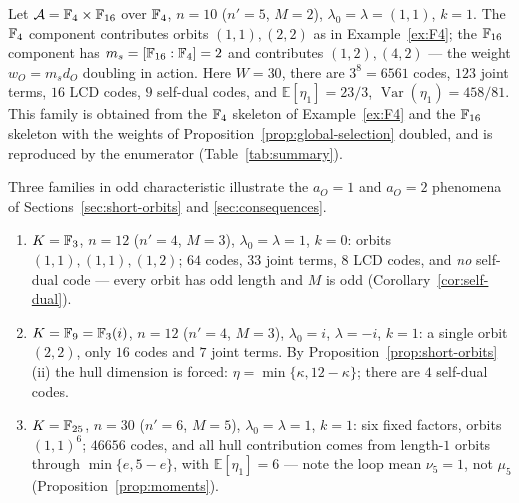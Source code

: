 \begin{example}\label{ex:mixed}
Let $\mathcal A=\mathbb F_4\times\mathbb F_{16}$ over $\mathbb F_4$, $n=10$ ($n'=5$, $M=2$),
$\lambda_0=\lambda=(1,1)$, $k=1$.  The $\mathbb F_4$ component contributes orbits
$(1,1),(2,2)$ as in Example~\ref{ex:F4}; the $\mathbb F_{16}$ component has
$m_s=[\mathbb F_{16}:\mathbb F_4]=2$ and contributes $(1,2),(4,2)$ --- the weight
$w_O=m_sd_O$ doubling in action.  Here $W=30$, there are $3^8=6561$ codes,
$123$ joint terms, $16$ LCD codes, $9$ self-dual codes, and
$\mathbb{E}[\eta_1]=23/3$, $\operatorname{Var}(\eta_1)=458/81$.  This family
is obtained from the $\mathbb F_4$ skeleton of Example~\ref{ex:F4} and the
$\mathbb F_{16}$ skeleton with the weights of Proposition~\ref{prop:global-selection}
doubled, and is reproduced by the enumerator (Table~\ref{tab:summary}).
\end{example}

\begin{example}\label{ex:char35}
Three families in odd characteristic illustrate the $a_O=1$ and $a_O=2$
phenomena of Sections~\ref{sec:short-orbits} and
\ref{sec:consequences}.
\begin{enumerate}
\item[\textup{(a)}] $K=\mathbb F_3$, $n=12$ ($n'=4$, $M=3$), $\lambda_0=\lambda=1$,
$k=0$: orbits $(1,1),(1,1),(1,2)$; $64$ codes, $33$ joint terms, $8$ LCD
codes, and \emph{no} self-dual code --- every orbit has odd length and $M$
is odd (Corollary~\ref{cor:self-dual}).
\item[\textup{(b)}] $K=\mathbb F_9=\mathbb F_3(i)$, $n=12$ ($n'=4$, $M=3$),
$\lambda_0=i$, $\lambda=-i$, $k=1$: a single orbit $(2,2)$, only $16$ codes
and $7$ joint terms.  By Proposition~\ref{prop:short-orbits}(ii) the hull
dimension is forced: $\eta=\min\{\kappa,12-\kappa\}$; there are $4$ self-dual
codes.
\item[\textup{(c)}] $K=\mathbb F_{25}$, $n=30$ ($n'=6$, $M=5$),
$\lambda_0=\lambda=1$, $k=1$: six fixed factors, orbits $(1,1)^6$; $46656$
codes, and all hull contribution comes from length-$1$ orbits through
$\min\{e,5-e\}$, with $\mathbb{E}[\eta_1]=6$ --- note the loop mean
$\nu_5=1$, not $\mu_5$ (Proposition~\ref{prop:moments}).
\end{enumerate}
\end{example}


